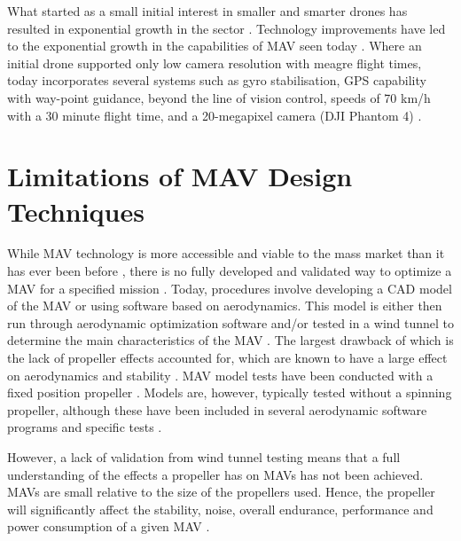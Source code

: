 What started as a small initial interest in smaller and smarter drones has resulted in exponential growth in the sector \cite{NONAMI2007, Wang2019}. Technology improvements have led to the exponential growth in the capabilities of \acrshort{MAV} seen today \cite{Yin2020, Jackson2016}. Where an initial drone supported only low camera resolution with meagre flight times, today incorporates several systems such as gyro stabilisation, \acrshort{GPS} capability with way-point guidance, beyond the line of vision control, speeds of 70 km/h with a 30 minute flight time, and a 20-megapixel camera (DJI Phantom 4) \cite{Peppa2019}. 





\section{Limitations of MAV Design Techniques}
\label{subsec:Limitations}
While \acrshort{MAV} technology is more accessible and viable to the mass market than it has ever been before \cite{Jackson2016}, there is no fully developed and validated way to optimize a \acrshort{MAV} for a specified mission \cite{Bronz2009, HASSANALIAN2019}. Today, procedures involve developing a \acrshort{CAD} model of the \acrshort{MAV} or using software based on aerodynamics. This model is either then run through aerodynamic optimization software and/or tested in a wind tunnel to determine the main characteristics of the \acrshort{MAV} \cite{Paulson2017}. The largest drawback of which is the lack of propeller effects accounted for, which are known to have a large effect on aerodynamics and stability \cite{Harikumar2021, Chinwicharnam2013}. \acrshort{MAV} model tests have been conducted with a fixed position propeller \cite{Shams2020b, Durai2014}. Models are, however, typically tested without a spinning propeller, although these have been included in several aerodynamic software programs and specific tests \cite{Aboelezz2020}. 

However, a lack of validation from wind tunnel testing means that a full understanding of the effects a propeller has on \acrshort{MAV}s has not been achieved. \acrshort{MAV}s are small relative to the size of the propellers used. Hence, the propeller will significantly affect the stability, noise, overall endurance, performance and power consumption of a given \acrshort{MAV} \cite{Shams2020, Chen2022}. 



